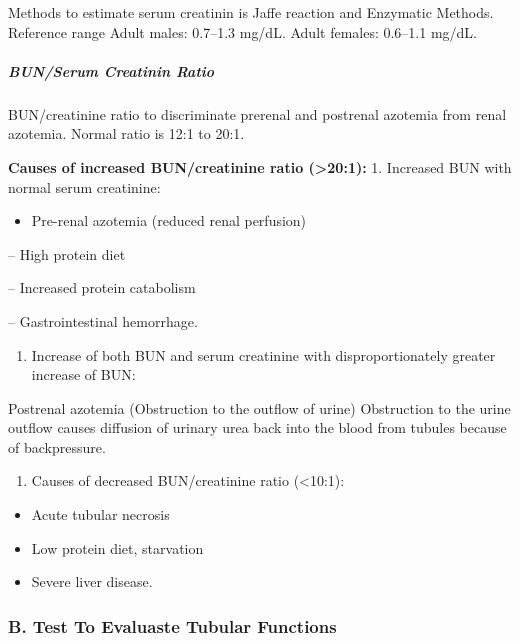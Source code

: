 \documentclass[
  letterpaper,
  DIV=11,
  numbers=noendperiod]{scrreprt}
\let\oldsubparagraph\subparagraph
\renewcommand{\subparagraph}[1]{\oldsubparagraph{#1}\mbox{}}
\providecommand{\tightlist}{%
  \setlength{\itemsep}{0pt}\setlength{\parskip}{0pt}}\usepackage{longtable,booktabs,array}
\begin{document}
Methods to estimate serum creatinin is Jaffe reaction and Enzymatic
Methods. Reference range Adult males: 0.7--1.3 mg/dL. Adult females:
0.6--1.1 mg/dL.

\subparagraph{BUN/Serum Creatinin Ratio}\label{bunserum-creatinin-ratio}

BUN/creatinine ratio to discriminate prerenal and postrenal azotemia
from renal azotemia. Normal ratio is 12:1 to 20:1.

\textbf{Causes of increased BUN/creatinine ratio (\textgreater20:1):} 1.
Increased BUN with normal serum creatinine:

\begin{itemize}
\tightlist
\item
  Pre-renal azotemia (reduced renal perfusion)
\end{itemize}

-- High protein diet

-- Increased protein catabolism

-- Gastrointestinal hemorrhage.

\begin{enumerate}
\def\labelenumi{\arabic{enumi}.}
\setcounter{enumi}{1}
\tightlist
\item
  Increase of both BUN and serum creatinine with disproportionately
  greater increase of BUN:
\end{enumerate}

Postrenal azotemia (Obstruction to the outflow of urine) Obstruction to
the urine outflow causes diffusion of urinary urea back into the blood
from tubules because of backpressure.

\begin{enumerate}
\def\labelenumi{\arabic{enumi}.}
\setcounter{enumi}{2}
\tightlist
\item
  Causes of decreased BUN/creatinine ratio (\textless10:1):
\end{enumerate}

\begin{itemize}
\tightlist
\item
  Acute tubular necrosis
\item
  Low protein diet, starvation
\item
  Severe liver disease.
\end{itemize}

\subsubsection{B. Test To Evaluaste Tubular
Functions}\label{b.-test-to-evaluaste-tubular-functions}
\end{document}

